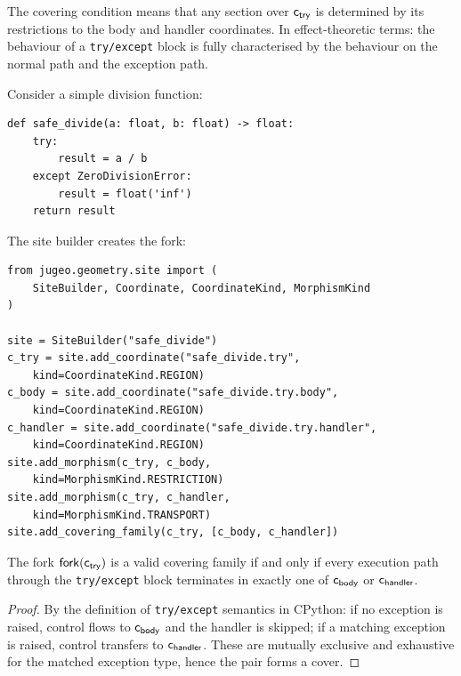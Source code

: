 \documentclass[11pt]{article}
\newcommand{\fork}{\mathsf{fork}}        %
\begin{document}
The covering condition means that any section over
$\mathsf{c}_{\mathsf{try}}$ is determined by its restrictions to the body
and handler coordinates.  In effect-theoretic terms: the behaviour of
a \texttt{try/except} block is fully characterised by the behaviour on
the normal path and the exception path.

Consider a simple division function:

\begin{lstlisting}[style=jugeo-python,caption={Exception handling in Python.}]
def safe_divide(a: float, b: float) -> float:
    try:
        result = a / b
    except ZeroDivisionError:
        result = float('inf')
    return result
\end{lstlisting}

The \JuGeo{} site builder creates the fork:

\begin{lstlisting}[style=jugeo-python,caption={Site construction for exception fork.}]
from jugeo.geometry.site import (
    SiteBuilder, Coordinate, CoordinateKind, MorphismKind
)

site = SiteBuilder("safe_divide")
c_try = site.add_coordinate("safe_divide.try",
    kind=CoordinateKind.REGION)
c_body = site.add_coordinate("safe_divide.try.body",
    kind=CoordinateKind.REGION)
c_handler = site.add_coordinate("safe_divide.try.handler",
    kind=CoordinateKind.REGION)
site.add_morphism(c_try, c_body,
    kind=MorphismKind.RESTRICTION)
site.add_morphism(c_try, c_handler,
    kind=MorphismKind.TRANSPORT)
site.add_covering_family(c_try, [c_body, c_handler])
\end{lstlisting}

\begin{proposition}\label{prop:fork-cover}
The fork $\fork(\coord_{\mathsf{try}})$ is a valid covering family
if and only if every execution path through the \texttt{try/except}
block terminates in exactly one of $\mathsf{c}_{\mathsf{body}}$ or
$\mathsf{c}_{\mathsf{handler}}$.
\end{proposition}

\begin{proof}
By the definition of \texttt{try/except} semantics in CPython: if no
exception is raised, control flows to $\mathsf{c}_{\mathsf{body}}$ and
the handler is skipped; if a matching exception is raised, control
transfers to $\mathsf{c}_{\mathsf{handler}}$.  These are mutually
exclusive and exhaustive for the matched exception type, hence the
pair forms a cover.
\end{proof}
\end{document}
